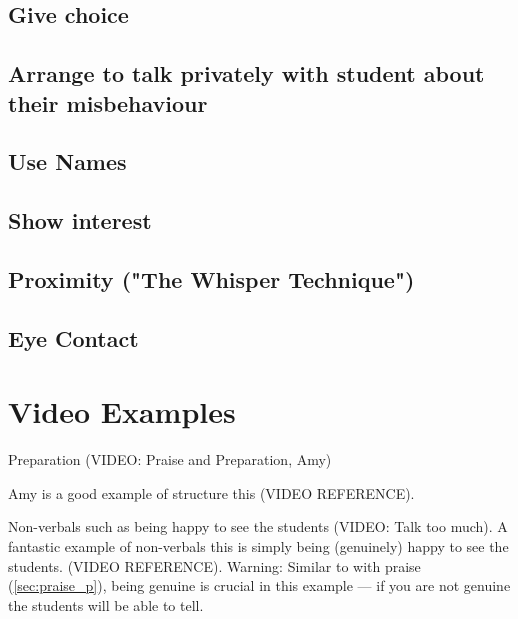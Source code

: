 \documentclass[12pt]{report}
\begin{document}
\section{Give choice}
\label{sec:give choice_c}



\section{Arrange to talk privately with student about their misbehaviour}
\label{sec:private_talk_c}



\section{Use Names}
\label{sec:use_names_c}



\section{Show interest}
\label{sec:show_interest_c}


\section{Proximity ("The Whisper Technique")}
\label{sec:proximity_c}



\section{Eye Contact}
\label{sec:eye_contact_c}










\chapter{Video Examples}
\label{chap:video_examples}

Preparation (VIDEO: Praise and Preparation, Amy)

 Amy is a good example of structure this (VIDEO REFERENCE).

Non-verbals such as being happy to see the students (VIDEO: Talk too much).
A fantastic example of non-verbals this is simply being (genuinely) happy to see the students.
(VIDEO REFERENCE). Warning: Similar to with praise (\ref{sec:praise_p}), being genuine is crucial in this example --- if you are not genuine the students will be able to tell.
\end{document}
